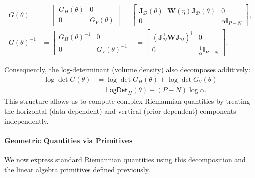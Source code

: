 \begin{align}
    G(\theta) &= \begin{bmatrix} G_H(\theta) & 0 \\ 0 & G_V(\theta) \end{bmatrix} 
    = \begin{bmatrix} \mathbf{J}_\mathcal{D}(\theta)^\top \mathbf{W}(\eta) \mathbf{J}_\mathcal{D}(\theta) & 0 \\ 0 & \alpha \mathbb{I}_{P-N} \end{bmatrix}, \\
    G(\theta)^{-1} &= \begin{bmatrix} G_H(\theta)^{-1} & 0 \\ 0 & G_V(\theta)^{-1} \end{bmatrix} 
    = \begin{bmatrix} (\mathbf{J}_\mathcal{D}^\top \mathbf{W} \mathbf{J}_\mathcal{D})^\dagger & 0 \\ 0 & \frac{1}{\alpha} \mathbb{I}_{P-N} \end{bmatrix}.
\end{align}

Consequently, the log-determinant (volume density) also decomposes additively:
\begin{align}
    \log \det G(\theta) &= \log \det G_H(\theta) + \log \det G_V(\theta) \nonumber \\
    &= \textsf{LogDet}_H(\theta) + (P-N) \log \alpha.
\end{align}
This structure allows us to compute complex Riemannian quantities by treating the horizontal (data-dependent) and vertical (prior-dependent) components independently.

\paragraph{Geometric Quantities via Primitives}
We now express standard Riemannian quantities using this decomposition and the linear algebra primitives defined previously.

